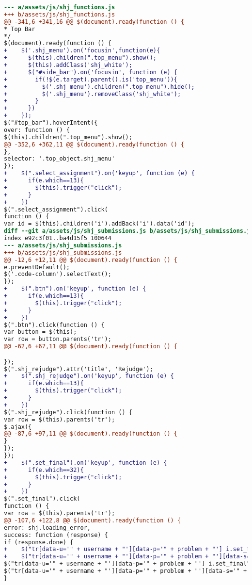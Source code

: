 \begin{itemize}
\begin{lstlisting}[language=diff, caption=Perubahan untuk mematuhi kriteria 2.1.1, label=lst_2.1.1, basicstyle=\ttfamily, frame=single,
columns=fullflexible, keepspaces=true, breaklines=true]
--- a/assets/js/shj_functions.js
+++ b/assets/js/shj_functions.js
@@ -341,6 +341,16 @@ $(document).ready(function () {
* Top Bar
*/
$(document).ready(function () {
+    $('.shj_menu').on('focusin',function(e){
+      $(this).children(".top_menu").show();
+      $(this).addClass('shj_white');
+      $("#side_bar").on('focusin', function (e) {
+        if(!$(e.target).parent().is('top_menu')){
+          $('.shj_menu').children(".top_menu").hide();
+          $('.shj_menu').removeClass('shj_white');
+        }
+      })
+    });
$("#top_bar").hoverIntent({
over: function () {
$(this).children(".top_menu").show();
@@ -352,6 +362,11 @@ $(document).ready(function () {
},
selector: '.top_object.shj_menu'
});
+    $(".select_assignment").on('keyup', function (e) {
+      if(e.which==13){
+        $(this).trigger("click");
+      }
+    })
$(".select_assignment").click(
function () {
var id = $(this).children('i').addBack('i').data('id');
diff --git a/assets/js/shj_submissions.js b/assets/js/shj_submissions.js
index e92c3f01..ba4d15f5 100644
--- a/assets/js/shj_submissions.js
+++ b/assets/js/shj_submissions.js
@@ -12,6 +12,11 @@ $(document).ready(function () {
e.preventDefault();
$('.code-column').selectText();
});
+    $(".btn").on('keyup', function (e) {
+      if(e.which==13){
+        $(this).trigger("click");
+      }
+    })
$(".btn").click(function () {
var button = $(this);
var row = button.parents('tr');
@@ -62,6 +67,11 @@ $(document).ready(function () {

});
$(".shj_rejudge").attr('title', 'Rejudge');
+    $(".shj_rejudge").on('keyup', function (e) {
+      if(e.which==13){
+        $(this).trigger("click");
+      }
+    })
$(".shj_rejudge").click(function () {
var row = $(this).parents('tr');
$.ajax({
@@ -87,6 +97,11 @@ $(document).ready(function () {
}
});
});
+    $(".set_final").on('keyup', function (e) {
+      if(e.which==32){
+        $(this).trigger("click");
+      }
+    })
$(".set_final").click(
function () {
var row = $(this).parents('tr');
@@ -107,6 +122,8 @@ $(document).ready(function () {
error: shj.loading_error,
success: function (response) {
if (response.done) {
+    $("tr[data-u='" + username + "'][data-p='" + problem + "'] i.set_final").attr("aria-checked", false);
+    $("tr[data-u='" + username + "'][data-p='" + problem + "'][data-s='" + submit_id + "'] i.set_final").attr("aria-checked", true);
$("tr[data-u='" + username + "'][data-p='" + problem + "'] i.set_final").removeClass('fa-check-circle-o color11').addClass('fa-circle-o');
$("tr[data-u='" + username + "'][data-p='" + problem + "'][data-s='" + submit_id + "'] i.set_final").removeClass('fa-circle-o').addClass('fa-check-circle-o color11');
}
\end{lstlisting}

\end{itemize}

